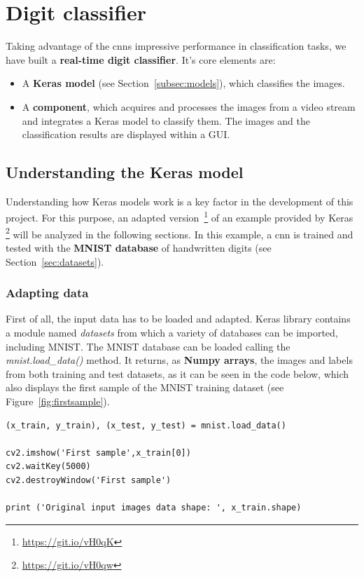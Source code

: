 \chapter{Digit classifier}\label{ch:digitclass}
Taking advantage of the \glspl{cnn} impressive performance in classification tasks, we have built a \textbf{real-time digit classifier}. It's core elements are:
\begin{itemize}
	\item A \textbf{Keras model} (see Section~\ref{subsec:models}), which classifies the images.
	\item A \textbf{component}, which acquires and processes the images from a video stream and integrates a Keras model to classify them. The images and the classification results are displayed within a GUI.
\end{itemize}

\section{Understanding the Keras model}\label{sec:understanding}
Understanding how Keras models work is a key factor in the development of this project. For this purpose, an adapted version~\footnote{\url{https://git.io/vH0qK}} of an example provided by Keras \footnote{\url{https://git.io/vH0qw}} will be analyzed in the following sections. In this example, a \gls{cnn} is trained and tested with the \textbf{MNIST database} of handwritten digits (see Section~\ref{sec:datasets}).

\subsection{Adapting data}\label{subsec:adaptdata}
First of all, the input data has to be loaded and adapted. Keras library contains a module named \textit{datasets} from which a variety of databases can be imported, including MNIST. The MNIST database can be loaded calling the \textit{mnist.load\_data()} method. It returns, as \textbf{Numpy arrays}, the images and labels from both training and test datasets, as it can be seen in the code below, which also displays the first sample of the MNIST training dataset (see Figure~\ref{fig:firstsample}).
\begin{lstlisting}
(x_train, y_train), (x_test, y_test) = mnist.load_data()

cv2.imshow('First sample',x_train[0])
cv2.waitKey(5000)
cv2.destroyWindow('First sample')

print ('Original input images data shape: ', x_train.shape) 
\end{lstlisting}

